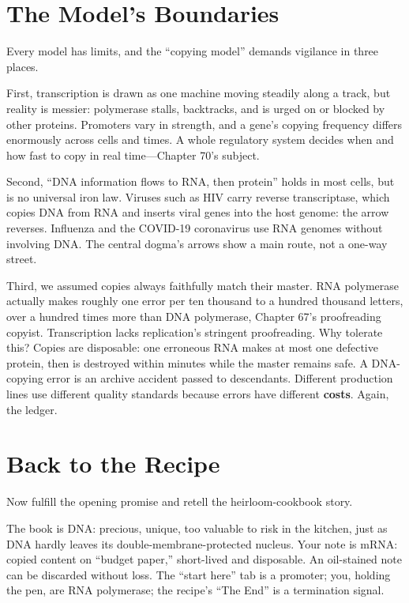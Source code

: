 \section{The Model's Boundaries}

Every model has limits, and the ``copying model'' demands vigilance in three places.

First, transcription is drawn as one machine moving steadily along a track, but reality is messier: polymerase stalls, backtracks, and is urged on or blocked by other proteins. Promoters vary in strength, and a gene's copying frequency differs enormously across cells and times. A whole regulatory system decides when and how fast to copy in real time---Chapter 70's subject.

Second, ``DNA information flows to RNA, then protein'' holds in most cells, but is no universal iron law. Viruses such as HIV carry reverse transcriptase, which copies DNA from RNA and inserts viral genes into the host genome: the arrow reverses. Influenza and the COVID-19 coronavirus use RNA genomes without involving DNA. The central dogma's arrows show a main route, not a one-way street.

Third, we assumed copies always faithfully match their master. RNA polymerase actually makes roughly one error per ten thousand to a hundred thousand letters, over a hundred times more than DNA polymerase, Chapter 67's proofreading copyist. Transcription lacks replication's stringent proofreading. Why tolerate this? Copies are disposable: one erroneous RNA makes at most one defective protein, then is destroyed within minutes while the master remains safe. A DNA-copying error is an archive accident passed to descendants. Different production lines use different quality standards because errors have different \textbf{costs}. Again, the ledger.

\section{Back to the Recipe}

Now fulfill the opening promise and retell the heirloom-cookbook story.

The book is DNA: precious, unique, too valuable to risk in the kitchen, just as DNA hardly leaves its double-membrane-protected nucleus. Your note is mRNA: copied content on ``budget paper,'' short-lived and disposable. An oil-stained note can be discarded without loss. The ``start here'' tab is a promoter; you, holding the pen, are RNA polymerase; the recipe's ``The End'' is a termination signal.

